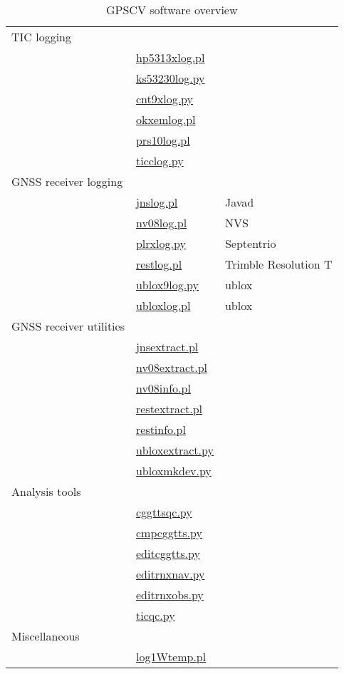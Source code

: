 \begin{table}
\begin{tabular}{l|l|l}
	\hline
TIC logging & & \\
	& \hyperlink{h:hp5313xlog}{hp5313xlog.pl} &\\
	& \hyperlink{h:ks53230log}{ks53230log.py} &\\
	& \hyperlink{h:cnt9xlog}{cnt9xlog.py} &\\
	& \hyperlink{h:okxemlog}{okxemlog.pl} & \\
	& \hyperlink{h:prs10log}{prs10log.pl} & \\
	& \hyperlink{h:ticclog}{ticclog.py} & \\
	\hline
GNSS receiver logging & & \\
	&	\hyperlink{h:jnslog}{jnslog.pl} & Javad\\
	& \hyperlink{h:nvslog}{nv08log.pl} & NVS\\
	& \hyperlink{h:plrxlog}{plrxlog.py} & Septentrio\\
	& \hyperlink{h:restlog}{restlog.pl} & Trimble Resolution T\\
	& \hyperlink{h:ublox9log}{ublox9log.py} & ublox\\
	& \hyperlink{h:ubloxlog}{ubloxlog.pl} & ublox\\
GNSS receiver utilities & & \\
	& \hyperlink{h:jnsextract}{jnsextract.pl} & \\
	& \hyperlink{h:nv08extract}{nv08extract.pl} & \\
	& \hyperlink{h:nv08info}{nv08info.pl} & \\
	& \hyperlink{h:restextract}{restextract.pl} & \\
	& \hyperlink{h:restinfo}{restinfo.pl} & \\
	& \hyperlink{h:ubloxextract}{ubloxextract.py} & \\
	& \hyperlink{h:ubloxmkdev}{ubloxmkdev.py} & \\
	\hline
Analysis tools & & \\
	& \hyperlink{h:cggttsqc}{cggttsqc.py} & \\
	& \hyperlink{h:cmpcggtts}{cmpcggtts.py} & \\
	& \hyperlink{h:editcggtts}{editcggtts.py} & \\
	& \hyperlink{h:editrnxnav}{editrnxnav.py} & \\
	& \hyperlink{h:editrnxobs}{editrnxobs.py} & \\
	& \hyperlink{h:ticqc}{ticqc.py} & \\
Miscellaneous & & \\
  & \hyperlink{h:log1Wtemp}{log1Wtemp.pl} & \\ 
	\hline
\end{tabular}
\caption{GPSCV software overview \label{t:OTTPSoftware} }
\end{table}

